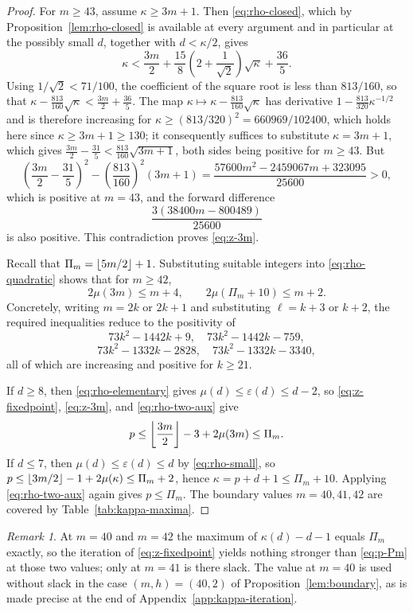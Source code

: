 \documentclass[11pt]{article}
\theoremstyle{definition}
\theoremstyle{remark}
\newtheorem{remark}[theorem]{Remark}
\numberwithin{equation}{section}
\DeclarePairedDelimiter{\floor}{\lfloor}{\rfloor}
\begin{document}
\begin{proof}
For $m\ge43$, assume $\kappa\ge3m+1$. Then \eqref{eq:rho-closed}, which by
Proposition~\ref{lem:rho-closed} is available at every argument and in particular at
the possibly small $d$, together with $d<\kappa/2$, gives
\[
  \kappa<\frac{3m}{2}
  +\frac{15}{8}\left(2+\frac1{\sqrt2}\right)\sqrt \kappa
  +\frac{36}{5}.
\]
Using $1/\sqrt2<71/100$, the coefficient of the square root is less than $813/160$, so that $\kappa-\tfrac{813}{160}\sqrt\kappa<\tfrac{3m}2+\tfrac{36}5$. The map $\kappa\mapsto\kappa-\tfrac{813}{160}\sqrt\kappa$ has derivative $1-\tfrac{813}{320}\kappa^{-1/2}$ and is therefore increasing for $\kappa\ge(813/320)^2=660969/102400$, which holds here since $\kappa\ge3m+1\ge130$; it consequently suffices to substitute $\kappa=3m+1$, which gives $\tfrac{3m}2-\tfrac{31}5<\tfrac{813}{160}\sqrt{3m+1}$, both sides being positive for $m\ge43$. But
\[
  \left(\frac{3m}{2}-\frac{31}{5}\right)^2
  -\left(\frac{813}{160}\right)^2(3m+1)
  =\frac{57600m^2-2459067m+323095}{25600}>0,
\]
which is positive at $m=43$, and the forward difference
\[
  \frac{3(38400m-800489)}{25600}
\]
is also positive. This contradiction proves \eqref{eq:z-3m}.

Recall that $\Pi_m=\floor{5m/2}+1$. Substituting suitable integers into \eqref{eq:rho-quadratic} shows that for $m\ge42$,
\begin{equation}\label{eq:rho-two-aux}
  2\mu(3m)\le m+4,
  \qquad
  2\mu(\Pi_m+10)\le m+2.
\end{equation}
Concretely, writing $m=2k$ or $2k+1$ and substituting $\ell=k+3$ or $k+2$, the required inequalities reduce to the positivity of
\[
  73k^2-1442k+9,
  \quad
  73k^2-1442k-759,
\]
\[
  73k^2-1332k-2828,
  \quad
  73k^2-1332k-3340,
\]
all of which are increasing and positive for $k\ge21$.

If $d\ge8$, then \eqref{eq:rho-elementary} gives $\mu(d)\le\varepsilon(d)\le d-2$, so \eqref{eq:z-fixedpoint}, \eqref{eq:z-3m}, and \eqref{eq:rho-two-aux} give
\[
  p\le\floor*{\frac{3m}{2}}-3+2\mu(3m)\le \Pi_m.
\]
If $d\le7$, then $\mu(d)\le\varepsilon(d)\le d$ by \eqref{eq:rho-small}, so $p\le\floor{3m/2}-1+2\mu(\kappa)\le\Pi_m+2$, hence $\kappa=p+d+1\le \Pi_m+10$. Applying \eqref{eq:rho-two-aux} again gives $p\le \Pi_m$. The boundary values $m=40,41,42$ are covered by Table~\ref{tab:kappa-maxima}.
\end{proof}

\begin{remark}\label{rem:p-tight}
At $m=40$ and $m=42$ the maximum of $\kappa(d)-d-1$ equals $\Pi_m$ exactly, so
the iteration of \eqref{eq:z-fixedpoint} yields nothing stronger than
\eqref{eq:p-Pm} at those two values; only at $m=41$ is there slack. The value at
$m=40$ is used without slack in the case $(m,h)=(40,2)$ of
Proposition~\ref{lem:boundary}, as is made precise at the end of
Appendix~\ref{app:kappa-iteration}.
\end{remark}
\end{document}
